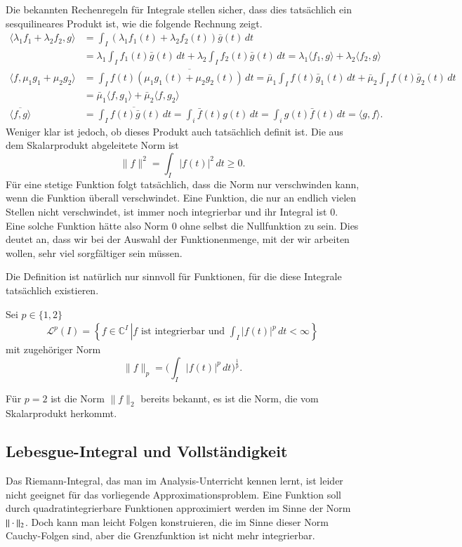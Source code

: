Die bekannten Rechenregeln für Integrale stellen sicher, dass dies
tatsächlich ein sesquilineares Produkt ist, wie die folgende Rechnung
zeigt.
\begin{align*}
\langle \lambda_1 f_1+\lambda_2 f_2,g\rangle
&=
\int_I (\lambda_1 f_1(t) + \lambda_2 f_2(t))\bar{g}(t)\,dt
\\
&=
\lambda_1 \int_I f_1(t) \bar{g}(t)\,dt + \lambda_2 \int_I f_2(t)\bar{g}(t)\,dt
= \lambda_1 \langle f_1,g\rangle + \lambda_2 \langle f_2,g\rangle
\\
\langle f,\mu_1 g_1 + \mu_2 g_2\rangle
&=
\int_I f(t) \overline{(\mu_1 g_1(t) + \mu_2 g_2(t))}\,dt
=
\bar{\mu}_1 \int_I f(t) \bar{g}_1(t)\,dt
+
\bar{\mu}_2 \int_I f(t) \bar{g}_2(t)\,dt
\\
&=
\bar{\mu}_1 \langle f,g_1\rangle
+
\bar{\mu}_2 \langle f,g_2\rangle
\\
\overline{
\langle f,g\rangle
}
&=
\overline{ \int_I f(t)\bar{g}(t)\,dt}
=
\int_i \bar{f}(t) g(t)\,dt
=
\int_i g(t) \bar{f}(t)\,dt
=
\langle g,f\rangle.
\end{align*}
Weniger klar ist jedoch, ob dieses Produkt auch tatsächlich definit ist.
Die aus dem Skalarprodukt abgeleitete Norm ist
\[
\|f\|^2 = \int_I |f(t)|^2\,dt \ge 0.
\]
Für eine stetige Funktion folgt tatsächlich, dass die Norm nur
verschwinden kann, wenn die Funktion überall verschwindet.
Eine Funktion, die nur an endlich vielen Stellen nicht verschwindet,
ist immer noch integrierbar und ihr Integral ist $0$.
Eine solche Funktion hätte also Norm $0$ ohne selbst die Nullfunktion zu
sein.
Dies deutet an, dass wir bei der Auswahl der Funktionenmenge, mit der
wir arbeiten wollen, sehr viel sorgfältiger sein müssen.

Die Definition ist natürlich nur sinnvoll für Funktionen, für die diese
Integrale tatsächlich existieren.
\begin{definition}
Sei $p\in \{1,2\}$ 
\begin{align*}
\mathcal{L}^p(I)
=
\left\{ f \in \mathbb C^I \, \left|
\text{
$f$ ist integrierbar und $\int_I |f(t)|^p\,dt<\infty$
}
\right.\right\}
\end{align*}
mit zugehöriger Norm
\[
\|f\|_p = \biggl(\int_I |f(t)|^p \,dt\biggr)^{\frac1p}.
\]
\end{definition}

Für $p=2$ ist die Norm $\|f\|_2$ bereits bekannt, es ist die Norm, die
vom Skalarprodukt herkommt.

\subsection{Lebesgue-Integral und Vollständigkeit}
Das Riemann-Integral, das man im Analysis-Unterricht kennen lernt, 
ist leider nicht geeignet für das vorliegende Approximationsproblem.
Eine Funktion soll durch quadratintegrierbare Funktionen approximiert
werden im Sinne der Norm $\|\mathstrut\cdot\mathstrut\|_2$.
Doch kann man leicht Folgen konstruieren, die im Sinne dieser Norm
Cauchy-Folgen sind, aber die Grenzfunktion ist nicht mehr integrierbar.

